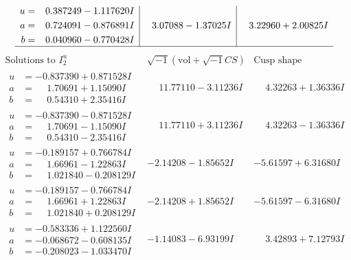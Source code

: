 \documentclass[1p]{elsarticle_modified}
\theoremstyle{definition}
\newcommand{\I}{\sqrt{-1}}
\begin{document}
$$\begin{array}{c|c|c}
\begin{aligned}
u &= \phantom{-}0.387249 - 1.117620 I \\
a &= \phantom{-}0.724091 - 0.876891 I \\
b &= \phantom{-}0.040960 - 0.770428 I\end{aligned}
 & \phantom{-}3.07088 - 1.37025 I & \phantom{-}3.22960 + 2.00825 I\\
 \hline 
 \end{array}$$\newpage$$\begin{array}{c|c|c}  
\text{Solutions to }I^u_{2}& \I (\text{vol} + \sqrt{-1}CS) & \text{Cusp shape}\\
 \hline 
\begin{aligned}
u &= -0.837390 + 0.871528 I \\
a &= \phantom{-}1.70691 + 1.15090 I \\
b &= \phantom{-}0.54310 + 2.35416 I\end{aligned}
 & \phantom{-}11.77110 - 3.11236 I & \phantom{-}4.32263 + 1.36336 I \\ \hline\begin{aligned}
u &= -0.837390 - 0.871528 I \\
a &= \phantom{-}1.70691 - 1.15090 I \\
b &= \phantom{-}0.54310 - 2.35416 I\end{aligned}
 & \phantom{-}11.77110 + 3.11236 I & \phantom{-}4.32263 - 1.36336 I \\ \hline\begin{aligned}
u &= -0.189157 + 0.766784 I \\
a &= \phantom{-}1.66961 - 1.22863 I \\
b &= \phantom{-}1.021840 - 0.208129 I\end{aligned}
 & -2.14208 - 1.85652 I & -5.61597 + 6.31680 I \\ \hline\begin{aligned}
u &= -0.189157 - 0.766784 I \\
a &= \phantom{-}1.66961 + 1.22863 I \\
b &= \phantom{-}1.021840 + 0.208129 I\end{aligned}
 & -2.14208 + 1.85652 I & -5.61597 - 6.31680 I \\ \hline\begin{aligned}
u &= -0.583336 + 1.122560 I \\
a &= -0.068672 - 0.608135 I \\
b &= -0.208023 - 1.033470 I\end{aligned}
 & -1.14083 - 6.93199 I & \phantom{-}3.42893 + 7.12793 I \\ \hline\begin{aligned}

\end{aligned}
\end{array}$$
\end{document}
